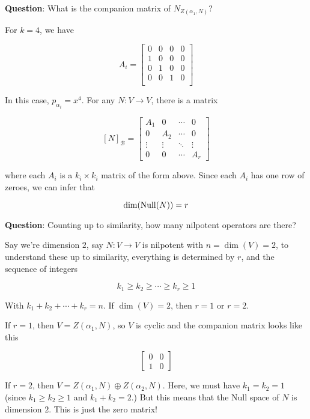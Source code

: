 \documentclass[12pt]{article}
\def\B{\mathcal B}
\begin{document}
  {\bf Question}: What is the companion matrix of $N_{Z(\alpha_1, N)}$?

  For $k = 4$, we have

  \[
    A_i = \begin{bmatrix}
      0 & 0 & 0 & 0 \\
      1 & 0 & 0 & 0 \\
      0 & 1 & 0 & 0 \\
      0 & 0 & 1 & 0 \\
    \end{bmatrix}
  \]

  In this case, $p_{\alpha_i} = x^4$. For any $N: V \to V$, there is a matrix

  \[
    [N]_\B = \begin{bmatrix}
      A_1 & 0 & \cdots & 0 \\
      0 & A_2 & \cdots & 0 \\
      \vdots & \vdots & \ddots & \vdots \\
      0 & 0 & \cdots & A_r
    \end{bmatrix}
  \]

  where each $A_i$ is a $k_i \times k_i$ matrix of the form above. Since each
  $A_i$ has one row of zeroes, we can infer that

  \[
    \dim(\mathrm{Null}(N)) = r
  \]

  {\bf Question}: Counting up to similarity, how many nilpotent operators are
  there?

  Say we're dimension $2$, say $N: V \to V$ is nilpotent with $n = \dim(V) = 2$,
  to understand these up to similarity, everything is determined by $r$, and the
  sequence of integers

  \[
    k_1 \ge k_2 \ge \cdots \ge k_r \ge 1
  \]

  With $k_1 + k_2 + \cdots + k_r = n$. If $\dim(V) = 2$, then $r = 1$ or $r =
  2$.

  If $r = 1$, then $V = Z(\alpha_1, N)$, so $V$ is cyclic and the companion
  matrix looks like this

  \[
    \begin{bmatrix}
      0 & 0 \\
      1 & 0
    \end{bmatrix}
  \]

  If $r = 2$, then $V = Z(\alpha_1, N) \oplus Z(\alpha_2, N)$. Here, we must
  have $k_1 = k_2 = 1$ (since $k_1 \ge k_2 \ge 1$ and $k_1 + k_2 = 2$.) But this
  means that the Null space of $N$ is dimension $2$. This is just the zero
  matrix!
\end{document}
